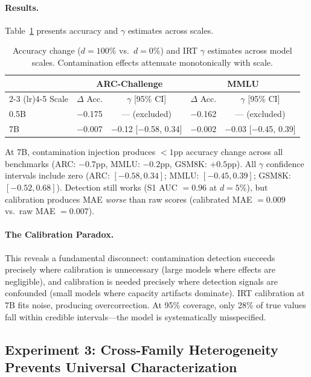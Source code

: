 \documentclass[11pt,a4paper]{article}
\begin{document}
\paragraph{Results.} Table~\ref{tab:scale} presents accuracy and $\gamma$ estimates across scales.

\begin{table}[h]
\centering
\caption{Accuracy change ($d=100\%$ vs.\ $d=0\%$) and IRT $\gamma$ estimates across model scales. Contamination effects attenuate monotonically with scale.}
\label{tab:scale}
\begin{tabular}{lcccc}
\toprule
& \multicolumn{2}{c}{ARC-Challenge} & \multicolumn{2}{c}{MMLU} \\
\cmidrule(lr){2-3} \cmidrule(lr){4-5}
Scale & $\Delta$ Acc. & $\gamma$ [95\% CI] & $\Delta$ Acc. & $\gamma$ [95\% CI] \\
\midrule
0.5B & $-$0.175 & --- (excluded) & $-$0.162 & --- (excluded) \\
7B & $-$0.007 & $-$0.12 [$-$0.58, 0.34] & $-$0.002 & $-$0.03 [$-$0.45, 0.39] \\
\bottomrule
\end{tabular}
\end{table}

At 7B, contamination injection produces $<1$pp accuracy change across all benchmarks (ARC: $-0.7$pp, MMLU: $-0.2$pp, GSM8K: $+0.5$pp). All $\gamma$ confidence intervals include zero (ARC: $[-0.58, 0.34]$; MMLU: $[-0.45, 0.39]$; GSM8K: $[-0.52, 0.68]$). Detection still works (S1 AUC $= 0.96$ at $d=5\%$), but calibration produces MAE \emph{worse} than raw scores (calibrated MAE $= 0.009$ vs.\ raw MAE $= 0.007$).

\paragraph{The Calibration Paradox.} This reveals a fundamental disconnect: contamination detection succeeds precisely where calibration is unnecessary (large models where effects are negligible), and calibration is needed precisely where detection signals are confounded (small models where capacity artifacts dominate). IRT calibration at 7B fits noise, producing overcorrection. At 95\% coverage, only 28\% of true values fall within credible intervals---the model is systematically misspecified.

\subsection{Experiment 3: Cross-Family Heterogeneity Prevents Universal Characterization}
\label{sec:exp-family}
\end{document}
